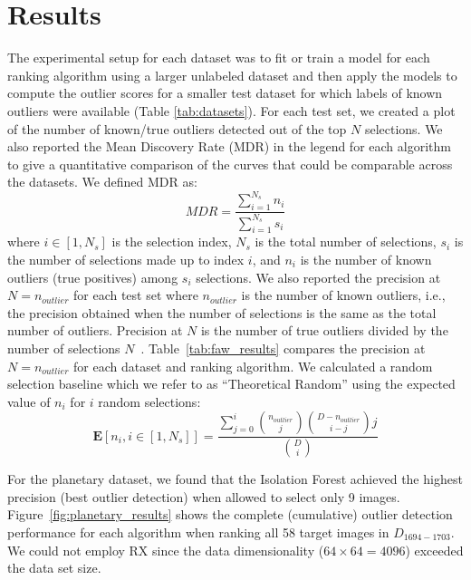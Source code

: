 \documentclass[letterpaper]{article} %
\newcommand{\todo}[1]{\textcolor{blue}{#1}}
\begin{document}
\section{Results}
The experimental setup for each dataset was to fit or train a model for
each ranking algorithm using a larger unlabeled dataset and then apply 
the models to compute the outlier scores for a smaller test dataset for which
labels of known outliers were available (Table \ref{tab:datasets}). 
For each test set, we created a plot of the number of known/true outliers 
detected out of the top $N$ selections. We also 
reported the Mean Discovery Rate (MDR) in the legend
for each algorithm to give a quantitative comparison of the curves that could
be comparable across the datasets. We defined MDR as:
\begin{equation}
MDR = \frac{\sum^{N_s}_{i=1} n_i}{\sum^{N_s}_{i=1} s_i}
\end{equation}
where $i \in [1, N_s]$ is the selection index,
 $N_s$ is the total number of selections,
 $s_i$ is the number of selections made up to index $i$,
 and $n_i$ is the number of known outliers (true positives)
among $s_i$ selections.
We also reported the precision at $N=n_{outlier}$ for each test set where
$n_{outlier}$ is the number of known outliers, i.e.,  the precision obtained 
when the number of selections is the same as the total number of outliers. 
Precision at $N$ is the number of true outliers divided by the number of 
selections $N$~\citep{campos2016evaluation}.
Table~\ref{tab:faw_results} compares the precision at $N=n_{outlier}$ for
each dataset and ranking algorithm. 
We calculated a random selection baseline which we refer to as ``Theoretical
Random'' using the expected value of $n_i$ for $i$ random selections:
\begin{equation}
\mathbf{E}[n_i, i \in[1, N_s]] = \frac{\sum^i_{j=0} {n_{outlier}\choose j} {D-n_{outlier}\choose i-j} j}{{D\choose i}}
\end{equation}

%

For the planetary dataset, we found that
the Isolation Forest achieved the highest precision (best outlier
detection) when allowed to select only \num{9} images.
Figure~\ref{fig:planetary_results} shows the complete (cumulative)
outlier detection performance for each algorithm when ranking
all \num{58} target images in $D_{1694-1703}$. We could not
employ RX since the data dimensionality ($64 \times 64 =
4096$) exceeded the data set size. 
\end{document}
